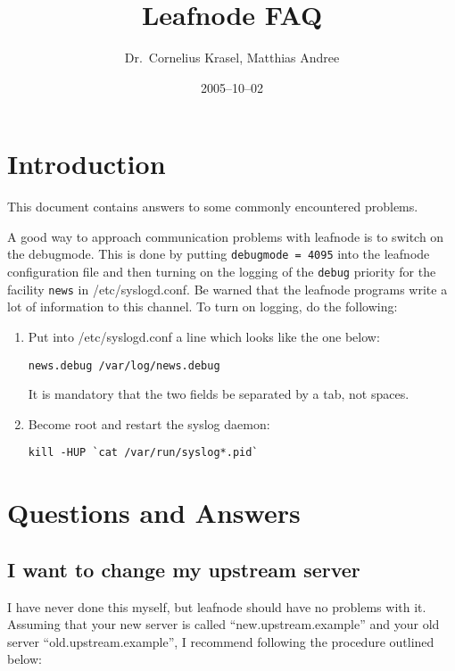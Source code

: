 \documentclass[10pt,english,a5paper]{article}
\begin{document}
\author{Dr.\ Cornelius Krasel, Matthias Andree}
\title{Leafnode FAQ}
\date{2005--10--02}
\maketitle
\tableofcontents
\section{Introduction}

This document contains answers to some commonly encountered problems.

A good way to approach communication problems with leafnode is to switch
on the debugmode. This is done by putting \verb"debugmode = 4095" into the
leafnode configuration file and then turning on the logging of the
\verb"debug" priority for the facility \verb"news" in /etc/syslogd.conf. Be warned that the leafnode programs write a lot of information to
this channel.
To turn on logging, do the following:

\begin{enumerate}

    \item Put into /etc/syslogd.conf a line which looks like the one below:
\begin{verbatim}
news.debug /var/log/news.debug
\end{verbatim}
    It is mandatory that the two fields be separated by a tab, not spaces.

\item Become root and restart the syslog daemon:
    \begin{verbatim}
kill -HUP `cat /var/run/syslog*.pid`
\end{verbatim}
    \end{enumerate}


\section{Questions and Answers}

\subsection{I want to change my upstream server}

    I have never done this myself, but leafnode should have no problems
    with it. Assuming that your new server is called
    ``new.upstream.example'' and your old server
    ``old.upstream.example'', I
    recommend following the procedure outlined below:
\end{document}

